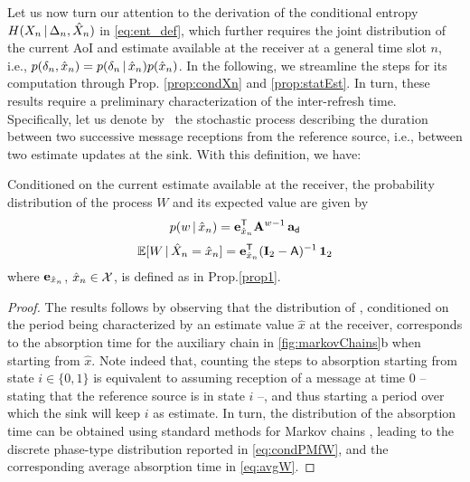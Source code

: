 Let us now turn our attention to the derivation of the conditional entropy $H(X_n\, | \,\Delta_n,\hat{X}_n)$ in \eqref{eq:ent_def}, which further requires the joint distribution of the current AoI and estimate available at the receiver at a general time slot $n$, i.e., $p(\delta_n,\hat{x}_n) = p(\delta_n\, | \,\hat{x}_n) p(\hat{x}_n)$. In the following, we streamline the steps for its computation through Prop. \ref{prop:condXn} and \ref{prop:statEst}. In turn, these results require a preliminary characterization of the inter-refresh time. Specifically, let us denote by \Irt\ the stochastic process describing the duration between two successive message receptions from the reference source, i.e., between two estimate updates at the sink. With this definition, we have:
\begin{prop}
Conditioned on the current estimate available at the receiver, the probability distribution of the process $W$ and its expected value are given by
\begin{align}
    p(w\, | \,\hat{x}_n) = \mathbf e_{\hat{x}_n}^{\mathsf T} \mathbf A^{w-1} \, \mathbf a_{\mathsf d}
    \label{eq:condPMfW}
\end{align}
\begin{align}
    \mathbb E[W \, | \, \hat{X}_n=\hat{x}_n] = \mathbf e_{\hat{x}_n}^{\mathsf T} (\mathbf I_2 - \mathsf A)^{-1} \, \mathbf 1_2
    \label{eq:avgW}
\end{align}
where $\mathbf e_{\hat{x}_n}$, $\hat{x}_n\in\mathcal X$, is defined as in Prop.\ref{prop1}.
\end{prop}
\begin{proof}
    The results follows by observing that the distribution of \Irt, conditioned on the period being characterized by an estimate value $\hat{x}$ at the receiver, corresponds to the absorption time for the auxiliary chain in \figr\ref{fig:markovChains}b when starting from $\hat{x}$. Note indeed that, counting the steps to absorption starting from state $i\in\{0,1\}$ is equivalent to assuming reception of a message at time $0$ \--- stating that the reference source is in state $i$ \---, and thus starting a period over which the sink will keep $i$ as estimate. In turn, the distribution of the absorption time can be obtained using standard methods for Markov chains \cite{Kemeny76}, leading to the discrete phase-type distribution reported in \eqref{eq:condPMfW}, and the corresponding average absorption time in \eqref{eq:avgW}.        
\end{proof}

